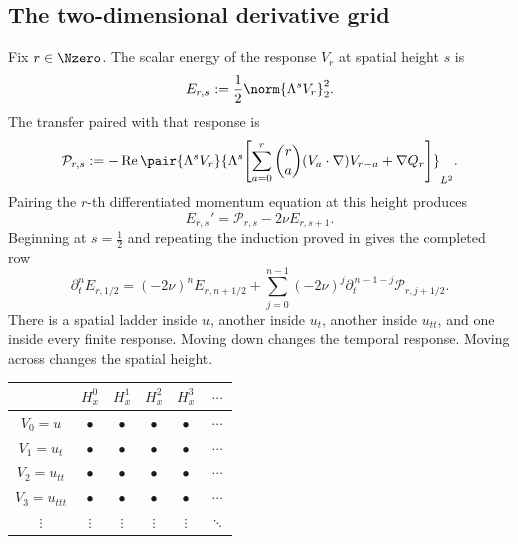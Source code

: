 \subsection{The two-dimensional derivative grid}\label{sub:SobolevRegularityInsideEveryCompletedRow}

Fix \(r\in\Nzero\).  The scalar energy of the response \(V_r\) at spatial
height \(s\) is
\[
  E_{r,s}:=\frac12\norm{\Lambda^sV_r}_2^2.
\]
The transfer paired with that response is
\[
  \mathcal P_{r,s}
  :=-
  \operatorname{Re}
  \pair{\Lambda^sV_r}
  {\Lambda^s\!\left[
    \sum_{a=0}^{r}\binom{r}{a}(V_a\cdot\nabla)V_{r-a}
    +\nabla Q_r
  \right]}_{L^2}.
\]
Pairing the \(r\)-th differentiated momentum equation at this height produces
\begin{equation}\label{eq:BodyEveryTemporalRowSpatialEnergy}
  E_{r,s}'=\mathcal P_{r,s}-2\nu E_{r,s+1}.
\end{equation}
Beginning at \(s=\tfrac12\) and repeating the induction proved in
 gives the completed row
\begin{equation}\label{eq:BodyEveryTemporalRowCompletedHeight}
  \partial_t^nE_{r,1/2}
  =(-2\nu)^nE_{r,n+1/2}
  +\sum_{j=0}^{n-1}
  (-2\nu)^j
  \partial_t^{\,n-1-j}\mathcal P_{r,j+1/2}.
\end{equation}
There is a spatial ladder inside \(u\), another inside \(u_t\), another
inside \(u_{tt}\), and one inside every finite response.  Moving down changes
the temporal response.  Moving across changes the spatial height.

\begin{center}
\captionsetup{hypcap=false}
\label{tab:MixedDerivativeGrid}
\renewcommand{\arraystretch}{1.35}
\begin{tabular}{@{}c c c c c c@{}}
\toprule
& \(H^0_x\) & \(H^1_x\) & \(H^2_x\) & \(H^3_x\) & \(\cdots\) \\
\midrule
\(V_0=u\) & \(\bullet\) & \(\bullet\) & \(\bullet\) & \(\bullet\) & \(\cdots\) \\
\(V_1=u_t\) & \(\bullet\) & \(\bullet\) & \(\bullet\) & \(\bullet\) & \(\cdots\) \\
\(V_2=u_{tt}\) & \(\bullet\) & \(\bullet\) & \(\bullet\) & \(\bullet\) & \(\cdots\) \\
\(V_3=u_{ttt}\) & \(\bullet\) & \(\bullet\) & \(\bullet\) & \(\bullet\) & \(\cdots\) \\
\(\vdots\) & \(\vdots\) & \(\vdots\) & \(\vdots\) & \(\vdots\) & \(\ddots\) \\
\bottomrule
\end{tabular}
\end{center}

